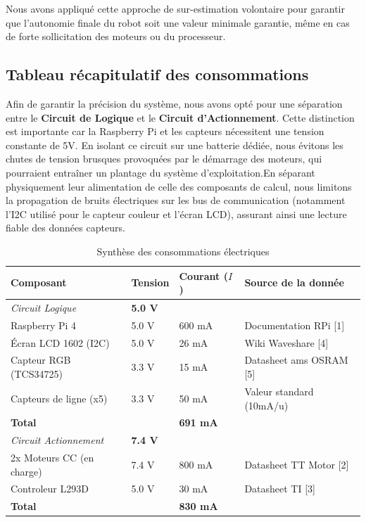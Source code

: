 Nous avons appliqué cette approche de sur-estimation volontaire pour garantir que l'autonomie finale du robot soit une valeur minimale garantie, même en cas de forte sollicitation des moteurs ou du processeur.

\subsection{Tableau récapitulatif des consommations}

Afin de garantir la précision du système, nous avons opté pour une séparation entre le \textbf{Circuit de Logique} et le \textbf{Circuit d'Actionnement}. Cette distinction est importante car la Raspberry Pi et les capteurs nécessitent une tension constante de 5V. En isolant ce circuit sur une batterie dédiée, nous évitons les chutes de tension brusques provoquées par le démarrage des moteurs, qui pourraient entraîner un plantage du système d'exploitation.En séparant physiquement leur alimentation de celle des composants de calcul, nous limitons la propagation de bruits électriques sur les bus de communication (notamment l'I2C utilisé pour le capteur couleur et l'écran LCD), assurant ainsi une lecture fiable des données capteurs.

\begin{table}[h!]
\centering
\begin{tabular}{@{}llll@{}}
\toprule
\textbf{Composant} & \textbf{Tension} & \textbf{Courant ($I$)} & \textbf{Source de la donnée} \\ \midrule
\textit{Circuit Logique} & \textbf{5.0 V} & & \\
Raspberry Pi 4 & 5.0 V & 600 mA & Documentation RPi [1] \\
Écran LCD 1602 (I2C) & 5.0 V & 26 mA & Wiki Waveshare [4] \\
Capteur RGB (TCS34725) & 3.3 V & 15 mA & Datasheet ams OSRAM [5] \\
Capteurs de ligne (x5) & 3.3 V & 50 mA & Valeur standard (10mA/u) \\
\textbf{Total} & & \textbf{691 mA} & \\ \midrule
\textit{Circuit Actionnement} & \textbf{7.4 V} & & \\
2x Moteurs CC (en charge) & 7.4 V & 800 mA & Datasheet TT Motor [2] \\
Controleur L293D & 5.0 V & 30 mA & Datasheet TI [3] \\
\textbf{Total} & & \textbf{830 mA} & \\ \bottomrule
\end{tabular}
\caption{Synthèse des consommations électriques}
\end{table}

